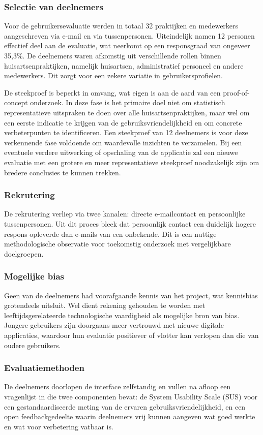 \subsubsection{Selectie van deelnemers}
Voor de gebruikersevaluatie werden in totaal 32 praktijken en medewerkers aangeschreven 
via e-mail en via tussenpersonen. Uiteindelijk namen 12 personen effectief deel aan de 
evaluatie, wat neerkomt op een responsgraad van ongeveer 35,3\%. De deelnemers waren 
afkomstig uit verschillende rollen binnen huisartsenpraktijken, namelijk huisartsen, 
administratief personeel en andere medewerkers. Dit zorgt voor een zekere variatie in 
gebruikersprofielen.
\medskip

De steekproef is beperkt in omvang, wat eigen is aan de aard van een 
proof-of-concept onderzoek. In deze fase is het primaire doel niet om 
statistisch representatieve uitspraken te doen over alle 
huisartsenpraktijken, maar wel om een eerste indicatie te krijgen van de 
gebruiksvriendelijkheid en om concrete verbeterpunten te identificeren. 
Een steekproef van 12 deelnemers is voor deze verkennende fase voldoende 
om waardevolle inzichten te verzamelen. Bij een eventuele verdere 
uitwerking of opschaling van de applicatie zal een nieuwe evaluatie met 
een grotere en meer representatieve steekproef noodzakelijk zijn om 
bredere conclusies te kunnen trekken.

\subsubsection{Rekrutering}
De rekrutering verliep via twee kanalen: directe e-mailcontact en persoonlijke 
tussenpersonen. Uit dit proces bleek dat persoonlijk contact een duidelijk hogere respons 
opleverde dan e-mails van een onbekende. Dit is een nuttige methodologische observatie voor toekomstig 
onderzoek met vergelijkbare doelgroepen.

\subsubsection{Mogelijke bias}
Geen van de deelnemers had voorafgaande kennis van het project, wat kennisbias grotendeels 
uitsluit. Wel dient rekening gehouden te worden met leeftijdsgerelateerde technologische 
vaardigheid als mogelijke bron van bias. Jongere gebruikers zijn doorgaans meer vertrouwd 
met nieuwe digitale applicaties, waardoor hun evaluatie positiever of vlotter kan verlopen 
dan die van oudere gebruikers.

\subsubsection{Evaluatiemethoden}
De deelnemers doorlopen de interface zelfstandig en vullen na afloop een vragenlijst in 
die twee componenten bevat: de System Usability Scale (SUS) voor een gestandaardiseerde 
meting van de ervaren gebruiksvriendelijkheid, en een open feedbackgedeelte waarin 
deelnemers vrij kunnen aangeven wat goed werkte en wat voor verbetering vatbaar is.
\medskip

